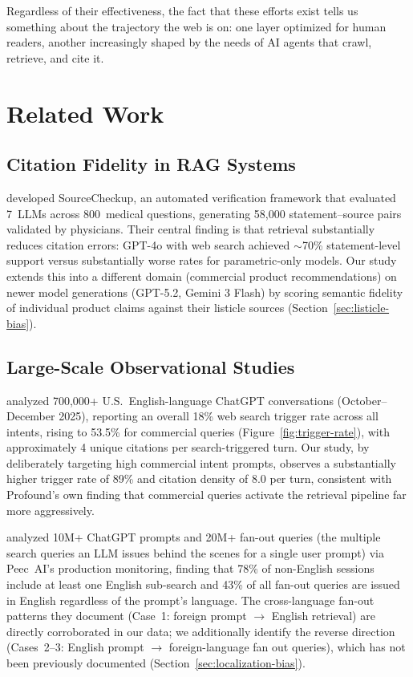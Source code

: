 Regardless of their effectiveness, the fact that these efforts exist tells us something about the trajectory the web is on: one layer optimized for human readers, another increasingly shaped by the needs of AI agents that crawl, retrieve, and cite it.

\section{Related Work}
\label{sec:related-work}

\subsection{Citation Fidelity in RAG Systems}
\label{sec:rw-fidelity}

\textcite{wu2025sourcecheckup} developed SourceCheckup, an automated verification framework that evaluated 7~LLMs across 800~medical questions, generating 58,000 statement--source pairs validated by physicians. Their central finding is that retrieval substantially reduces citation errors: GPT-4o with web search achieved $\sim$70\% statement-level support versus substantially worse rates for parametric-only models. Our study extends this into a different domain (commercial product recommendations) on newer model generations (GPT-5.2, Gemini 3 Flash) by scoring semantic fidelity of individual product claims against their listicle sources (Section~\ref{sec:listicle-bias}).

\subsection{Large-Scale Observational Studies}
\label{sec:rw-observational}

\textcite{punturo2026citationsources} analyzed 700,000+ U.S.\ English-language ChatGPT conversations (October--December 2025), reporting an overall 18\% web search trigger rate across all intents, rising to 53.5\% for commercial queries (Figure~\ref{fig:trigger-rate}), with approximately 4 unique citations per search-triggered turn. Our study, by deliberately targeting high commercial intent prompts, observes a substantially higher trigger rate of 89\% and citation density of 8.0 per turn, consistent with Profound's own finding that commercial queries activate the retrieval pipeline far more aggressively.

\textcite{rudzki2026english} analyzed 10M+ ChatGPT prompts and 20M+ fan-out queries (the multiple search queries an LLM issues behind the scenes for a single user prompt) via Peec~AI's production monitoring, finding that 78\% of non-English sessions include at least one English sub-search and 43\% of all fan-out queries are issued in English regardless of the prompt's language. The cross-language fan-out patterns they document (Case~1: foreign prompt $\rightarrow$ English retrieval) are directly corroborated in our data; we additionally identify the reverse direction (Cases~2--3: English prompt $\rightarrow$ foreign-language fan out queries), which has not been previously documented (Section~\ref{sec:localization-bias}).

